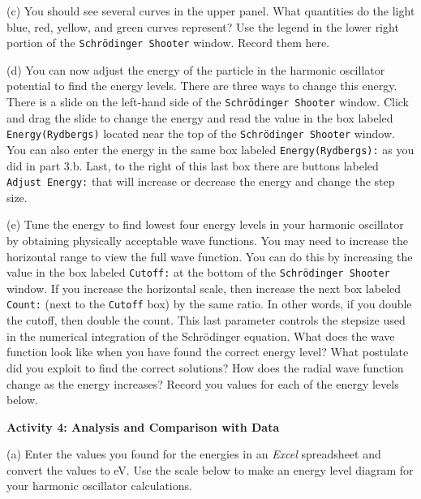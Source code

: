 \newpage

(c) You should see several curves in the upper panel.
What quantities do the light blue, red, yellow, and green curves represent?
Use the legend in the lower right portion of the {\tt Schr\"odinger Shooter}
window.
Record them here.
\vspace{2.5cm}

(d) You can now adjust the energy of the particle in the harmonic oscillator potential to find 
the energy levels.
There are three ways to change this energy.
There is a slide on the left-hand side of the {\tt Schr\"odinger Shooter} window.
Click and drag the slide to change the energy and read the value
in the box labeled {\tt Energy(Rydbergs)} located near the top of the 
{\tt Schr\"odinger Shooter} window.
You can also enter the energy in the same box
labeled {\tt Energy(Rydbergs):} as you did in part 3.b.
Last, to the right of this last box there are buttons labeled
{\tt Adjust Energy:} that will increase or decrease the energy and change the step size.

(e) Tune the energy to find lowest four energy levels in your harmonic oscillator by obtaining
physically acceptable wave functions.
You may need to increase the horizontal range to view the full wave function.
You can do this by increasing the value in the box labeled {\tt Cutoff:} at the
bottom of the {\tt Schr\"odinger Shooter} window.
If you increase the horizontal scale, then increase the next box labeled
{\tt Count:} (next to the {\tt Cutoff} box) by the same ratio.
In other words, if you double the cutoff, then double the count.
This last parameter controls the stepsize used in the numerical integration of
the Schr\"odinger equation.
What does the wave function look like when you have found the correct energy level?
What postulate did you exploit to find the correct solutions?
How does the radial wave function change as the energy increases?
Record you values for each of the energy levels below.

\vspace{9.0cm}

\textbf{Activity 4: Analysis and Comparison with Data}

(a) Enter the values you found for the energies in an {\it Excel} spreadsheet
and convert the values to eV.
Use the scale below to make an energy level diagram for your harmonic oscillator calculations.

\newpage

\vspace{0.25in}

